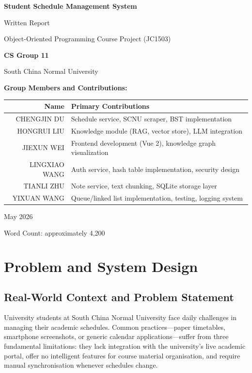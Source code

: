 \documentclass[11pt,a4paper]{article}
\begin{document}
\begin{titlepage}
\centering
\vspace*{2.5cm}
{\LARGE \textbf{Student Schedule Management System}\par}
\vspace{0.8cm}
{\Large Written Report\par}
{\normalsize Object-Oriented Programming Course Project (JC1503)\par}
\vspace{1.2cm}
{\large \textbf{CS Group 11}\par}
{\normalsize South China Normal University\par}
\vspace{0.8cm}
{\normalsize \textbf{Group Members and Contributions:}\par}
\vspace{0.3cm}
\begin{tabular}{rl}
\toprule
\textbf{Name} & \textbf{Primary Contributions} \\
\midrule
CHENGJIN DU & Schedule service, SCNU scraper, BST implementation \\
HONGRUI LIU & Knowledge module (RAG, vector store), LLM integration \\
JIEXUN WEI & Frontend development (Vue 2), knowledge graph visualization \\
LINGXIAO WANG & Auth service, hash table implementation, security design \\
TIANLI ZHU & Note service, text chunking, SQLite storage layer \\
YIXUAN WANG & Queue/linked list implementation, testing, logging system \\
\bottomrule
\end{tabular}
\vspace{1.5cm}

{\normalsize May 2026\par}
\vspace{1cm}
{\normalsize Word Count: approximately 4,200\par}
\end{titlepage}

\section{Problem and System Design}

\subsection{Real-World Context and Problem Statement}
University students at South China Normal University face daily challenges in managing their academic schedules. Common practices---paper timetables, smartphone screenshots, or generic calendar applications---suffer from three fundamental limitations: they lack integration with the university's live academic portal, offer no intelligent features for course material organisation, and require manual synchronisation whenever schedules change.
\end{document}
